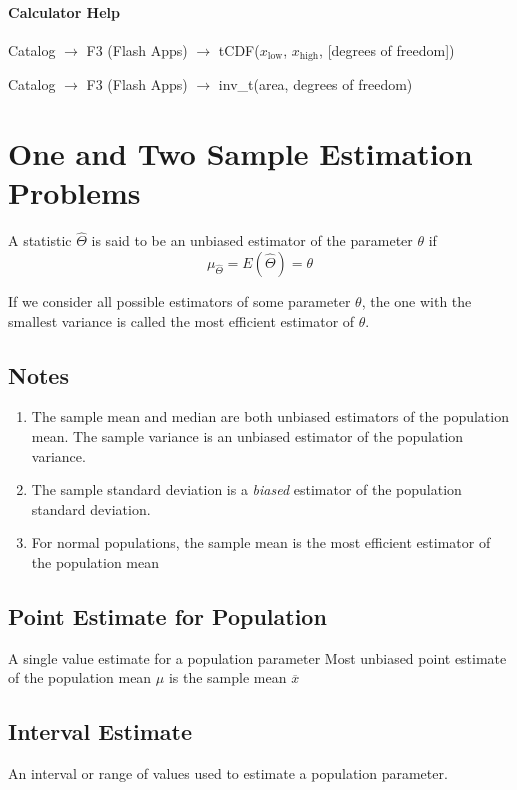 \documentclass{book}
\begin{document}
\subsubsection{Calculator Help}

Catalog $\rightarrow$ F3 (Flash Apps) $\rightarrow$ tCDF($x_\text{low}$, $x_\text{high}$, [degrees of freedom])

Catalog $\rightarrow$ F3 (Flash Apps) $\rightarrow$ inv\_t(area, degrees of freedom)

\chapter{One and Two Sample Estimation Problems}

A statistic $\hat{\Theta}$ is said to be an unbiased estimator of the parameter $\theta$ if 
$$\mu_{\hat{\Theta}} = E(\hat{\Theta}) = \theta$$

If we consider all possible estimators of some parameter $\theta$, the one with the smallest variance is called the most efficient estimator of $\theta$.

\section{Notes}
\begin{enumerate}
\item The sample mean and median are both unbiased estimators of the population mean.
The sample variance is an unbiased estimator of the population variance.
\item The sample standard deviation is a \emph{biased} estimator of the population standard deviation.
\item For normal populations, the sample mean is the most efficient estimator of the population mean
\end{enumerate}  

\section{Point Estimate for Population}
A single value estimate for a population parameter
Most unbiased point estimate of the population mean $\mu$ is the sample mean $\overline x $

\section{Interval Estimate}
An interval or range of values used to estimate a population parameter.
\end{document}
